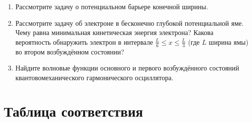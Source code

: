 \documentclass[12pt]{article}
\begin{document}
\begin{enumerate}
\item\label{_48}
Рассмотрите задачу о потенциальном барьере конечной ширины.

\item\label{_49}
Рассмотрите задачу об электроне в бесконечно глубокой потенциальной
яме. Чему равна минимальная кинетическая энергия электрона? Какова вероятность обнаружить электрон в интервале $\frac{L}{6}\le x\le \frac{L}{3}$ (где $L$ ширина ямы) во втором возбуждённом состоянии?

\item\label{_50}
Найдите волновые функции основного и первого возбуждённого состояний квантовомеханического гармонического осциллятора.

\end{enumerate}

\clearpage

%
\section{Таблица соответствия}
%
\end{document}
